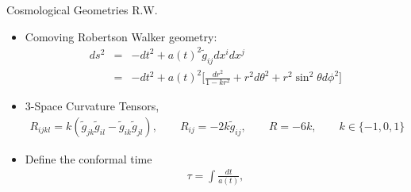 \documentclass[8pt,aspectratio=1610]{beamer}
\begin{document}
\begin{frame}{Cosmological Geometries R.W.}
	\begin{itemize}
		\item Comoving Robertson Walker geometry:
		\begin{eqnarray}
		ds^2 &=& -dt^2 + a(t)^2 \tilde g_{ij}dx^i dx^j
		\nonumber\\
		&=& -dt^2 + a(t)^2\bigg[\frac{dr^2}{1-kr^2} + r^2 d\theta^2 + r^2 \sin^2\theta d\phi^2\bigg]
		\end{eqnarray}
		\item 3-Space Curvature Tensors,
		\begin{eqnarray}
		R_{ijkl} = k(\tilde g_{jk}\tilde g_{il} - \tilde g_{ik}\tilde g_{jl}), \qquad R_{ij} = -2k\tilde g_{ij}, \qquad R = -6k,\qquad k \in \{-1,0,1\}
		\end{eqnarray}
		\item Define the conformal time
		\begin{eqnarray}
		\tau = \int \frac{dt}{a(t)},
		\end{eqnarray}
	\end{itemize}
\end{frame}

\end{document}
